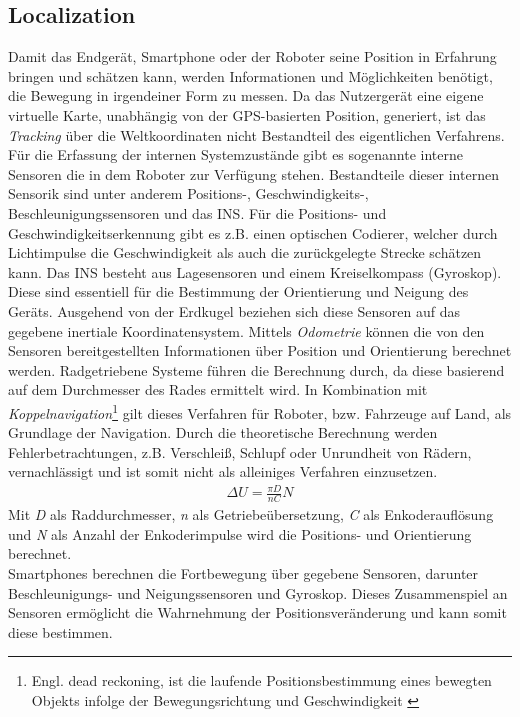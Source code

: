 \subsection{Localization}
Damit das Endgerät, Smartphone oder der Roboter seine Position in Erfahrung bringen und schätzen kann, werden Informationen und Möglichkeiten 
benötigt, die Bewegung in irgendeiner Form zu messen. Da das Nutzergerät eine eigene virtuelle Karte, unabhängig von der \acs{GPS}-basierten 
Position, generiert, ist das \textit{Tracking} über die Weltkoordinaten nicht Bestandteil des eigentlichen Verfahrens. Für die Erfassung der 
internen Systemzustände gibt es sogenannte interne Sensoren die in dem Roboter zur Verfügung stehen. Bestandteile dieser internen 
Sensorik sind unter anderem Positions-, Geschwindigkeits-, Beschleunigungssensoren und das \acl{INS}. Für die Positions- und 
Geschwindigkeitserkennung gibt es z.B. einen optischen Codierer, welcher durch Lichtimpulse die Geschwindigkeit als auch die zurückgelegte 
Strecke schätzen kann. Das \acs{INS} besteht aus Lagesensoren und einem Kreiselkompass (Gyroskop). Diese sind essentiell für die Bestimmung 
der Orientierung und Neigung des Geräts. Ausgehend von der Erdkugel beziehen sich diese Sensoren auf das gegebene inertiale Koordinatensystem.
Mittels \textit{Odometrie} können die von den Sensoren bereitgestellten Informationen über Position und Orientierung berechnet werden. Radgetriebene 
Systeme führen die Berechnung durch, da diese basierend auf dem Durchmesser des Rades ermittelt wird. In Kombination mit \textit{Koppelnavigation}\footnote{Engl. dead reckoning, ist die laufende Positionsbestimmung eines bewegten Objekts infolge der Bewegungsrichtung und Geschwindigkeit \cite{koppelnavigation.2019j}}
gilt dieses Verfahren für Roboter, bzw. Fahrzeuge auf Land, als Grundlage der Navigation. Durch die theoretische Berechnung werden 
Fehlerbetrachtungen, z.B. Verschleiß, Schlupf oder Unrundheit von Rädern, vernachlässigt und ist somit nicht als alleiniges Verfahren einzusetzen. 
\begin{align}
    \Delta U = \frac{\pi D}{\textit{n}C}N
\end{align}
Mit \textit{D} als Raddurchmesser, \textit{n} als Getriebeübersetzung, \textit{C} als Enkoderauflösung und \textit{N} als Anzahl der 
Enkoderimpulse wird die Positions- und Orientierung berechnet. 
\\ 
Smartphones berechnen die Fortbewegung über gegebene Sensoren, darunter Beschleunigungs- und Neigungssensoren und Gyroskop. Dieses Zusammenspiel an 
Sensoren ermöglicht die Wahrnehmung der Positionsveränderung und kann somit diese bestimmen.
